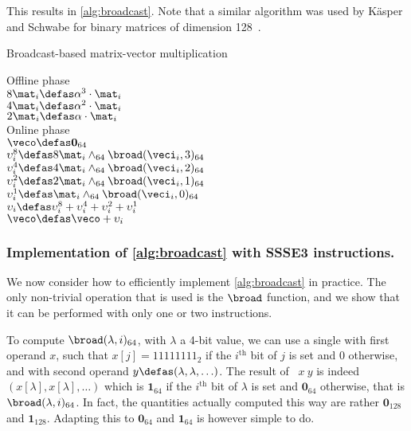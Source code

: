 This results in \autoref{alg:broadcast}. Note that a similar algorithm was used by Käsper and Schwabe for binary
matrices of dimension 128~\cite{DBLP:conf/ches/KasperS09}.

\begin{algorithm}[!htb]
  \caption{Broadcast-based matrix-vector multiplication}
\label{alg:broadcast}
  Offline phase\\
  {
  $8\mat_i \defas \alpha^3\cdot\mat_i$\\
  $4\mat_i \defas \alpha^2\cdot\mat_i$\\
  $2\mat_i \defas \alpha\cdot\mat_i$\\
  }
  Online phase\\
  $\veco \defas \mathbf{0}_{64}$\\
  {
  $\upsilon_i^8 \defas 8\mat_i \wedge_{64} \broad(\veci_i,3)_{64}$\\
  $\upsilon_i^4 \defas 4\mat_i \wedge_{64} \broad(\veci_i,2)_{64}$\\
  $\upsilon_i^2 \defas 2\mat_i \wedge_{64} \broad(\veci_i,1)_{64}$\\
  $\upsilon_i^1 \defas  \mat_i \wedge_{64} \broad(\veci_i,0)_{64}$\\
  $\upsilon_i \defas \upsilon_i^8 + \upsilon_i^4 + \upsilon_i^2 + \upsilon_i^1$\\
  $\veco \defas \veco + \upsilon_i$\\
  }
  \Return{$\veco$}
\end{algorithm}


\subsubsection{Implementation of \autoref{alg:broadcast} with SSSE3 instructions.}
We now consider how to efficiently implement \autoref{alg:broadcast} in practice. The only
non-trivial operation that is used is the $\broad$ function, and we show that it can be performed
with only one or two \pshufb{} instructions.

To compute $\broad(\lambda,i)_{64}$, with $\lambda$ a 4-bit value,
we can use a single \pshufb{} with first operand
$x$, such that $x[j] = 11111111_2$ if the $i^\text{th}$ bit of $j$ is set and 0 otherwise, and with second operand $y \defas (\lambda, \lambda, \ldots)$.
The result of \pshufb{}~$x~y$ is indeed $(x[\lambda], x[\lambda], \ldots)$ which is $\mathbf{1}_{64}$ if the $i^\text{th}$
bit of $\lambda$ is set and $\mathbf{0}_{64}$ otherwise, that is $\broad(\lambda, i)_{64}$. In fact, the quantities actually
computed this way are rather $\mathbf{0}_{128}$ and $\mathbf{1}_{128}$. Adapting this to $\mathbf{0}_{64}$
and $\mathbf{1}_{64}$ is however simple to do.

